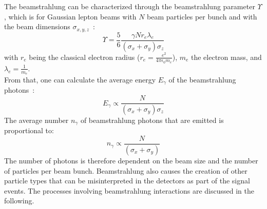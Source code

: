 The beamstrahlung can be characterized through the beamstrahlung parameter $\Upsilon$, which is for Gaussian lepton beams with $N$ beam particles per bunch and with the beam dimensions $\sigma_{x,y,z}$~\cite{PairBkg_cross_section, AndreSailer}:
\begin{equation}
 \Upsilon=\frac{5}{6}\frac{\gamma N r_e \lambda_e}{(\sigma_x+\sigma_y)\sigma_z}
\end{equation}
with $r_e$ being the classical electron radius ($r_e = \frac{e^2}{4\pi \epsilon_0 m_e}$), $m_e$ the electron mass, and $\lambda_e=\frac{1}{m_e}$.\\
From that, one can calculate the average energy $E_{\gamma}$ of the beamstrahlung photons~\cite[p. 77]{Beamstrahlung_CLIC}:
\begin{equation}
 E_{\gamma} \propto \frac{N}{(\sigma_x+\sigma_y)\sigma_z}
 \label{eq:pair_energy}
\end{equation}
The average number $n_{\gamma}$ of beamstrahlung photons that are emitted is proportional to:
\begin{equation}
 n_{\gamma} \propto \frac{N}{(\sigma_x+\sigma_y)}
 \label{eq:pair_number}
\end{equation}
The number of photons is therefore dependent on the beam size and the number of particles per beam bunch.
Beamstrahlung also causes the creation of other particle types that can be misinterpreted in the detectors as part of the signal events.
The processes involving beamstrahlung interactions are discussed in the following.

